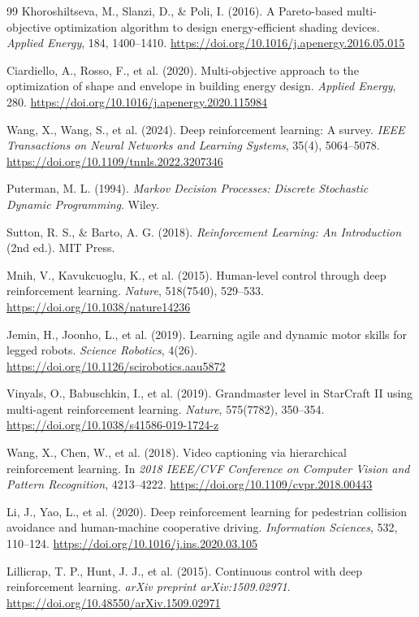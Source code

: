 \begin{thebibliography}{99}
Khoroshiltseva, M., Slanzi, D., \& Poli, I. (2016). A Pareto-based multi-objective optimization algorithm to design energy-efficient shading devices. \textit{Applied Energy}, 184, 1400--1410. \url{https://doi.org/10.1016/j.apenergy.2016.05.015}

Ciardiello, A., Rosso, F., et al. (2020). Multi-objective approach to the optimization of shape and envelope in building energy design. \textit{Applied Energy}, 280. \url{https://doi.org/10.1016/j.apenergy.2020.115984}

Wang, X., Wang, S., et al. (2024). Deep reinforcement learning: A survey. \textit{IEEE Transactions on Neural Networks and Learning Systems}, 35(4), 5064--5078. \url{https://doi.org/10.1109/tnnls.2022.3207346}

Puterman, M. L. (1994). \textit{Markov Decision Processes: Discrete Stochastic Dynamic Programming}. Wiley.

Sutton, R. S., \& Barto, A. G. (2018). \textit{Reinforcement Learning: An Introduction} (2nd ed.). MIT Press.

Mnih, V., Kavukcuoglu, K., et al. (2015). Human-level control through deep reinforcement learning. \textit{Nature}, 518(7540), 529--533. \url{https://doi.org/10.1038/nature14236}

Jemin, H., Joonho, L., et al. (2019). Learning agile and dynamic motor skills for legged robots. \textit{Science Robotics}, 4(26). \url{https://doi.org/10.1126/scirobotics.aau5872}

Vinyals, O., Babuschkin, I., et al. (2019). Grandmaster level in StarCraft II using multi-agent reinforcement learning. \textit{Nature}, 575(7782), 350--354. \url{https://doi.org/10.1038/s41586-019-1724-z}

Wang, X., Chen, W., et al. (2018). Video captioning via hierarchical reinforcement learning. In \textit{2018 IEEE/CVF Conference on Computer Vision and Pattern Recognition}, 4213--4222. \url{https://doi.org/10.1109/cvpr.2018.00443}

Li, J., Yao, L., et al. (2020). Deep reinforcement learning for pedestrian collision avoidance and human-machine cooperative driving. \textit{Information Sciences}, 532, 110--124. \url{https://doi.org/10.1016/j.ins.2020.03.105}

Lillicrap, T. P., Hunt, J. J., et al. (2015). Continuous control with deep reinforcement learning. \textit{arXiv preprint arXiv:1509.02971}. \url{https://doi.org/10.48550/arXiv.1509.02971}


\end{thebibliography}
